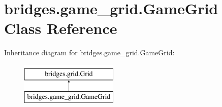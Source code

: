 \hypertarget{classbridges_1_1game__grid_1_1_game_grid}{}\section{bridges.\+game\+\_\+grid.\+Game\+Grid Class Reference}
\label{classbridges_1_1game__grid_1_1_game_grid}
Inheritance diagram for bridges.\+game\+\_\+grid.\+Game\+Grid\+:\begin{figure}[H]
\begin{center}
\leavevmode
\includegraphics[height=2.000000cm]{classbridges_1_1game__grid_1_1_game_grid}
\end{center}
\end{figure}
